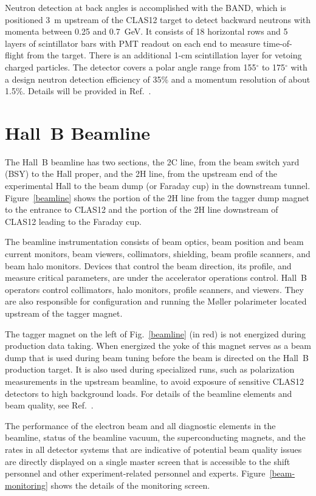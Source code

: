 \documentclass[final,3p]{elsarticle}
\begin{document}
\begin{twocolumn}
Neutron detection at back angles is accomplished with the BAND, which is positioned 3~m upstream of the CLAS12
target to detect backward neutrons with momenta between 0.25 and 0.7~GeV. It consists of 18 horizontal rows and
5 layers of scintillator bars with PMT readout on each end to measure time-of-flight from the target. There is an
additional 1-cm scintillation layer for vetoing charged particles. The detector covers a polar angle range from
155$^\circ$ to 175$^\circ$ with a design neutron detection efficiency of 35\% and a momentum resolution of about
1.5\%. Details will be provided in Ref.~\cite{BAND}.

\section{Hall~B Beamline} 

The Hall~B beamline has two sections, the 2C line, from the beam switch yard (BSY) to the Hall proper, and the 2H
line, from the upstream end of the experimental Hall to the beam dump (or Faraday cup) in the downstream tunnel.
Figure~\ref{beamline} shows the portion of the 2H line from the tagger dump magnet to the entrance to CLAS12
and the portion of the 2H line downstream of CLAS12 leading to the Faraday cup.

The beamline instrumentation consists of beam optics, beam position and beam current monitors, beam viewers,
collimators, shielding, beam profile scanners, and beam halo monitors. Devices that control the beam direction, its
profile, and measure critical parameters, are under the accelerator operations control. Hall~B operators control
collimators, halo monitors, profile scanners, and viewers. They are also responsible for configuration and running the
M{\o}ller polarimeter located upstream of the tagger magnet.

The tagger magnet on the left of Fig.~\ref{beamline} (in red) is not energized during production data taking. When
energized the yoke of this magnet serves as a beam dump that is used during beam tuning before the beam is directed
on the Hall~B production target. It is also used during specialized runs, such as polarization measurements in the
upstream beamline, to avoid exposure of sensitive CLAS12 detectors to high background loads. For details of the
beamline elements and beam quality, see Ref.~\cite{beamline}.  

The performance of the electron beam and all diagnostic elements in the beamline, status of the beamline vacuum, 
the superconducting magnets, and the rates in all detector systems that are indicative of potential beam quality issues 
are directly displayed on a single master screen that is accessible to the shift personnel and other experiment-related 
personnel and experts. Figure~\ref{beam-monitoring} shows the details of the monitoring screen.     


\end{twocolumn}
\end{document}
